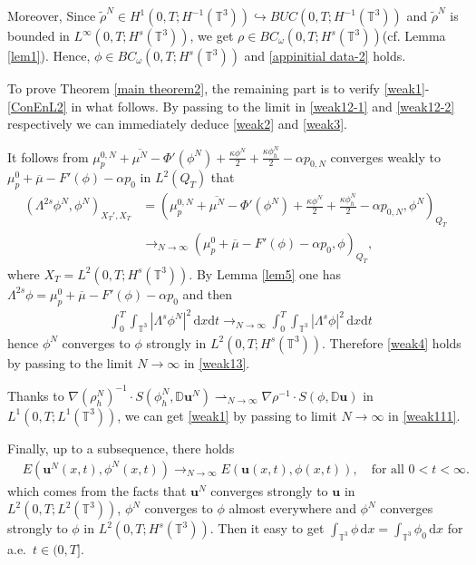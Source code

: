 \documentclass[reqno,a4paper,11pt]{amsart}
\theoremstyle{plain}
\numberwithin{equation}{section}
\renewcommand{\d}{\mathrm{d}}
\newcommand{\dxdt}{\,\d x \d t}
\begin{document}
Moreover, Since $\widetilde{\rho}^{N}\in H^{1}(0,T;  H^{-1}(\mathbb{T}^{3}))\hookrightarrow BUC(0,T; H^{-1}(\mathbb{T}^{3}))$ and
$\widetilde{\rho}^{N}$ is bounded in $L^{\infty}(0,T;  H^{s}(\mathbb{T}^{3}))$, we get %
$\rho \in BC_{\omega}(0,T; H^{s}(\mathbb{T}^{3}))$(cf. Lemma \ref{lem1}). Hence, $\phi \in BC_{\omega}(0,T;  H^{s}(\mathbb{T}^{3}))$ and \eqref{appinitial data-2} holds.

To prove Theorem \ref{main theorem2}, the remaining part is  to verify \eqref{weak1}-\eqref{ConEnL2} in what follows. By passing to the limit in \eqref{weak12-1} and \eqref{weak12-2} respectively we can immediately deduce \eqref{weak2} and \eqref{weak3}.


It follows from $\mu_{p}^{0,N}+\overline{\mu^{N}}-\Phi'(\phi^{N})+\frac{\kappa\phi^{N}}{2}+\frac{\kappa\phi_h^{N}}{2}-\alpha p_{0,N}$  converges weakly to $\mu_{p}^{0}+\overline{\mu}-F'(\phi)-\alpha p_{0}$ in $L^{2}(Q_{T})$ that
\begin{align*}
	(\Lambda^{2s}\phi^{N},\phi^{N})_{X_{T}', X_{T}}&=(\mu_{p}^{0,N}+\overline{\mu^{N}}-\Phi'(\phi^{N})+\frac{\kappa\phi^{N}}{2}
	+\frac{\kappa\phi_h^{N}}{2}-\alpha p_{0,N}, \phi^{N})_{Q_{T}}\\&\rightarrow _{N\rightarrow\infty}
	(\mu_{p}^{0}+\overline{\mu}-F'(\phi)-\alpha p_{0}, \phi)_{Q_{T}},
\end{align*}
where $X_{T}=L^{2}(0,T;H^{s}(\mathbb{T}^{3}))$. By Lemma \ref{lem5}  one has  $\Lambda^{2s}\phi=\mu_{p}^{0}+\overline{\mu}-F'(\phi)-\alpha p_{0}$ and then
\begin{align}\label{Strong convergence}
	&\int_{0}^T\int_{\mathbb{T}^{3}}|\Lambda^{s} \phi^{N}|^{2} \dxdt \rightarrow _{N\rightarrow\infty}\int_{0}^T\int_{\mathbb{T}^{3}}|\Lambda^{s} \phi|^{2} \dxdt
\end{align}
hence $\phi^{N}$ converges to $\phi$ strongly in $L^{2}(0,T;  H^{s}(\mathbb{T}^{3}))$. Therefore \eqref{weak4} holds by passing to the limit $N\rightarrow\infty$ in \eqref{weak13}.

Thanks to $\nabla (\rho_{h}^{N})^{-1}\cdot S(\phi_{h}^{N},\mathbb{ D}\mathbf{u}^{N}) \rightharpoonup _{N\rightarrow\infty} \nabla \rho^{-1}\cdot S(\phi,\mathbb{ D}\mathbf{u})$ in $L^{1}(0,T;  L^{1}(\mathbb{T}^{3}))$, we can get  \eqref{weak1} by passing to limit $N\rightarrow\infty$ in \eqref{weak111}.

Finally, up to a subsequence, there holds
\begin{align*}
	& E(\mathbf{u}^{N}(x,t),\phi^{N}(x,t))\rightarrow _{N\rightarrow\infty}E(\mathbf{u}(x,t),\phi(x,t)), \quad\text{for all $0<t< \infty$}.
\end{align*} which comes from the facts that $\mathbf{u}^{N}$ converges strongly to $\mathbf{u}$ in $L^{2}(0,T;  L^{2}(\mathbb{T}^{3}))$,  $\phi^{N}$ converges to $\phi$ almost everywhere and $\phi^{N}$ converges strongly to $\phi$ in $L^{2}(0,T;  H^{s}(\mathbb{T}^{3}))$. Then it easy to get $\int_{\mathbb{T}^{3}}\phi\, \mathrm{d} x=\int_{\mathbb{T}^{3}}\phi_0\, \mathrm{d} x$ for a.e.~$t \in (0,T]$. 
\end{document}
